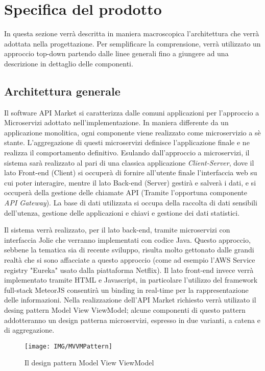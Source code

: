 \newpage
\section{Specifica del prodotto}
In questa sezione verrà descritta in maniera macroscopica l'architettura che verrà adottata nella progettazione. Per semplificare la comprensione, verrà utilizzato un approccio top-down partendo dalle linee generali fino a giungere ad una descrizione in dettaglio delle componenti.

\subsection{Architettura generale}
Il software API Market si caratterizza dalle comuni applicazioni per l'approccio a Microservizi adottato nell'implementazione. In maniera differente da un applicazione monolitica, ogni componente viene realizzato come microservizio a sè stante. L'aggregazione di questi microservizi definisce l'applicazione finale e ne realizza il comportamento definitivo. Esulando dall'approccio a microservizi, il sistema sarà realizzato al pari di una classica applicazione \textit{Client-Server}, dove il lato Front-end (Client) si occuperà di fornire all'utente finale l'interfaccia web su cui poter interagire, mentre il lato Back-end (Server) gestirà e salverà i dati, e si occuperà della gestione delle chiamate API (Tramite l'opportuna componente \textit{API Gateway}). La base di dati utilizzata si occupa della raccolta di dati sensibili dell'utenza, gestione delle applicazioni e chiavi e gestione dei dati statistici.

Il sistema verrà realizzato, per il lato back-end, tramite microservizi con interfaccia Jolie che verranno implementati con codice Java. Questo approccio, sebbene la tematica sia di recente sviluppo, risulta molto gettonato dalle grandi realtà che si sono affacciate a questo approccio (come ad esempio l'AWS Service registry "Eureka" usato dalla piattaforma Netflix). Il lato front-end invece verrà implementato tramite HTML e Javascript, in particolare l'utilizzo del framework full-stack MeteorJS consentirà un binding in real-time per la rappresentazione delle informazioni.
Nella realizzazione dell'API Market richiesto verrà utilizato il desing pattern Model View ViewModel; alcune componenti di questo pattern addotteranno un design patterna microservizi, espresso in due varianti, a catena e di aggregazione.
\begin{figure}
	\centering
	\texttt{[image: IMG/MVVMPattern]}
	\caption{Il design pattern Model View ViewModel}
\end{figure}

